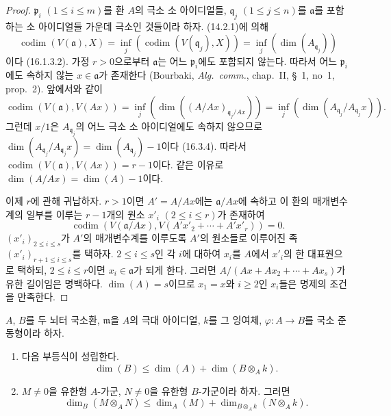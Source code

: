 \begin{proof}
$\mathfrak{p}_i$ $(1\leq i\leq m)$를 환 $A$의 극소 소
아이디얼들, $\mathfrak{q}_j$ $(1\leq j\leq n)$를
$\mathfrak{a}$를 포함하는 소 아이디얼들 가운데 극소인 것들이라
하자. (14.2.1)에 의해
\[
  \operatorname{codim}(V(\mathfrak{a}),X)
  =\inf_j(\operatorname{codim}(V(\mathfrak{q}_j),X))
  =\inf_j(\dim(A_{\mathfrak{q}_j}))
\]
이다 (16.1.3.2). 가정 $r>0$으로부터 $\mathfrak{a}$는 어느
$\mathfrak{p}_i$에도 포함되지 않는다. 따라서 어느
$\mathfrak{p}_i$에도 속하지 않는
$x\in\mathfrak{a}$가 존재한다 (Bourbaki, \emph{Alg.~comm.},
chap.~II, \S~1, no~1, prop.~2). 앞에서와 같이
\[
  \operatorname{codim}(V(\mathfrak{a}),V(Ax))
  =\inf_j(\dim((A/Ax)_{\mathfrak{q}_j/Ax}))
  =\inf_j(\dim(A_{\mathfrak{q}_j}/A_{\mathfrak{q}_j}x)).
\]
그런데 $x/1$은 $A_{\mathfrak{q}_j}$의 어느 극소 소 아이디얼에도
속하지 않으므로
$\dim(A_{\mathfrak{q}_j}/A_{\mathfrak{q}_j}x)
=\dim(A_{\mathfrak{q}_j})-1$이다 (16.3.4). 따라서
$\operatorname{codim}(V(\mathfrak{a}),V(Ax))=r-1$이다. 같은 이유로
$\dim(A/Ax)=\dim(A)-1$이다.

이제 $r$에 관해 귀납하자. $r>1$이면 $A'=A/Ax$에는
$\mathfrak{a}/Ax$에 속하고 이 환의 매개변수계의 일부를 이루는
$r-1$개의 원소 $x'_i$ $(2\leq i\leq r)$가 존재하여
\[
  \operatorname{codim}(V(\mathfrak{a}/Ax),
  V(A'x'_2+\cdots+A'x'_r))=0.
\]
$(x'_i)_{2\leq i\leq s}$가 $A'$의 매개변수계를 이루도록
$A'$의 원소들로 이루어진 족 $(x'_i)_{r+1\leq i\leq s}$를 택하자.
$2\leq i\leq s$인 각 $i$에 대하여 $x_i$를 $A$에서 $x'_i$의 한
대표원으로 택하되, $2\leq i\leq r$이면
$x_i\in\mathfrak{a}$가 되게 한다. 그러면
$A/(Ax+Ax_2+\cdots+Ax_s)$가 유한 길이임은 명백하다.
$\dim(A)=s$이므로 $x_1=x$와 $i\geq2$인 $x_i$들은 명제의 조건을
만족한다.
\end{proof}

\begin{proposition}[16.3.9]
\label{0.16.3.9-fr}
$A$, $B$를 두 뇌터 국소환, $\mathfrak{m}$을 $A$의 극대 아이디얼,
$k$를 그 잉여체, $\varphi:A\to B$를 국소 준동형이라 하자.
\begin{enumerate}
  \item[\rm{(i)}] 다음 부등식이 성립한다.
  \begin{equation}
  \label{0.16.3.9.1-fr}
  \tag{16.3.9.1}
    \dim(B)\leq\dim(A)+\dim(B\otimes_A k).
  \end{equation}
  \item[\rm{(ii)}] $M\neq0$을 유한형 $A$-가군,
  $N\neq0$을 유한형 $B$-가군이라 하자. 그러면
  \begin{equation}
  \label{0.16.3.9.2-fr}
  \tag{16.3.9.2}
    \dim_B(M\otimes_A N)
    \leq\dim_A(M)+\dim_{B\otimes_A k}(N\otimes_A k).
  \end{equation}
\end{enumerate}
\end{proposition}

